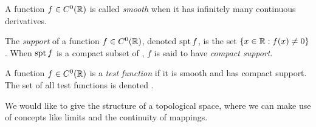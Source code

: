 %
%

    \begin{defn}
      A function $f\in C^0(\mathbb{R})$ is called \emph{smooth} when it has infinitely many continuous derivatives.
    \end{defn}
    \begin{defn}[support]
      The \emph{support} of a function $f\in C^0(\mathbb{R})$, denoted $\operatorname{spt} f$, is the set $\{x\in\mathbb{R}: f(x)\ne0\}$.
      When $\operatorname{spt} f$ is a compact subset of \R, $f$ is said to have \emph{compact support}.
    \end{defn}
    \begin{defn}
      A function $f\in C^0(\mathbb{R})$ is a \emph{test function} if it is smooth and has compact support.
      The set of all test functions is denoted \D.
    \end{defn}

    We would like to give \D the structure of a topological space, where we can make use of concepts like limits and the continuity of mappings.

